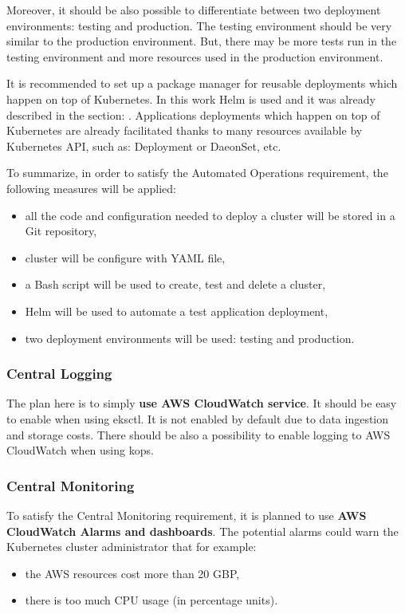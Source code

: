 Moreover, it should be also possible to differentiate between two deployment environments: testing and production. The testing environment should be very similar to the production environment. But, there may be more tests run in the testing environment and more resources used in the production environment.

It is recommended to set up a package manager for reusable deployments which happen on top of Kubernetes\cite{gruntwork-howto-blog}. In this work Helm is used and it was already described in the section: . Applications deployments which happen on top of Kubernetes are already facilitated thanks to many resources available by Kubernetes API, such as: Deployment\cite{k8s-resources-depl} or DaeonSet\cite{k8s-resources-ds}, etc.

To summarize, in order to satisfy the Automated Operations requirement, the following measures will be applied:
\begin{itemize}
\item all the code and configuration needed to deploy a cluster will be stored in a Git repository,
\item cluster will be configure with YAML file,
\item a Bash script will be used to create, test and delete a cluster,
\item Helm will be used to automate a test application deployment,
\item two deployment environments will be used: testing and production.
\end{itemize}


\subsubsection{Central Logging}

The plan here is to simply \textbf{use AWS CloudWatch service}. It should be easy to enable when using eksctl. It is not enabled by default due to data ingestion and storage costs\cite{eksctl-cw}. There should be also a possibility to enable logging to AWS CloudWatch when using kops.

\subsubsection{Central Monitoring}

To satisfy the Central Monitoring requirement, it is planned to use \textbf{AWS CloudWatch Alarms and dashboards}. The potential alarms could warn the Kubernetes cluster administrator that for example:
\begin{itemize}
\item the AWS resources cost more than 20 GBP,
\item there is too much CPU usage (in percentage units).
\end{itemize}

